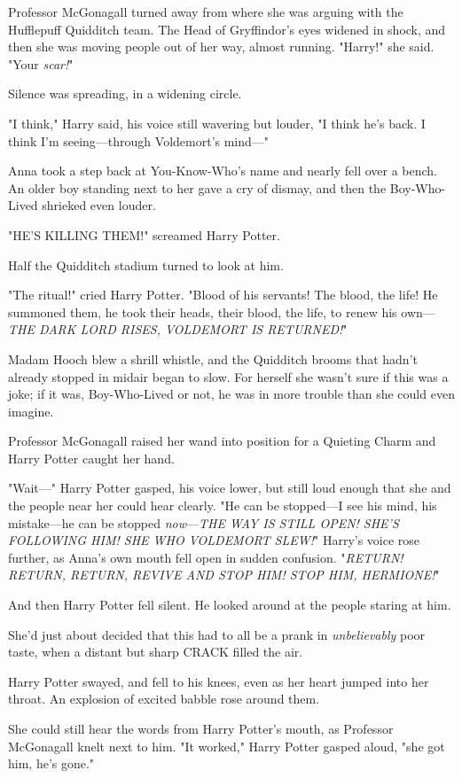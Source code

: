 Professor McGonagall turned away from where she was arguing with the Hufflepuff
Quidditch team. The Head of Gryffindor's eyes widened in shock, and then she
was moving people out of her way, almost running. "Harry!" she said. "Your
\emph{scar!}"

Silence was spreading, in a widening circle.

"I think," Harry said, his voice still wavering but louder, "I think he's back.
I think I'm seeing---through Voldemort's mind---"

Anna took a step back at You-Know-Who's name and nearly fell over a bench.
An older boy standing next to her gave a cry of dismay, and then the
Boy-Who-Lived shrieked even louder.

"HE'S KILLING THEM!" screamed Harry Potter.

Half the Quidditch stadium turned to look at him.

"The ritual!" cried Harry Potter. "Blood of his servants! The blood, the life!
He summoned them, he took their heads, their blood, the life, to renew his
own---\emph{THE DARK LORD RISES, VOLDEMORT IS RETURNED!}"

Madam Hooch blew a shrill whistle, and the Quidditch brooms that hadn't already
stopped in midair began to slow. For herself she wasn't sure if this was a
joke; if it was, Boy-Who-Lived or not, he was in more trouble than she could
even imagine.

Professor McGonagall raised her wand into position for a Quieting Charm and
Harry Potter caught her hand.

"Wait---" Harry Potter gasped, his voice lower, but still loud enough that she
and the people near her could hear clearly. "He can be stopped---I see his
mind, his mistake---he can be stopped \emph{now}---\emph{THE WAY IS STILL OPEN!
SHE'S FOLLOWING HIM! SHE WHO VOLDEMORT SLEW!}" Harry's voice rose further, as
Anna's own mouth fell open in sudden confusion. "\emph{RETURN! RETURN, RETURN,
REVIVE AND STOP HIM! STOP HIM, HERMIONE!}"

And then Harry Potter fell silent. He looked around at the people staring at
him.

She'd just about decided that this had to all be a prank in \emph{unbelievably}
poor taste, when a distant but sharp CRACK filled the air.

Harry Potter swayed, and fell to his knees, even as her heart jumped into her
throat. An explosion of excited babble rose around them.

She could still hear the words from Harry Potter's mouth, as Professor
McGonagall knelt next to him. "It worked," Harry Potter gasped aloud, "she got
him, he's gone."

